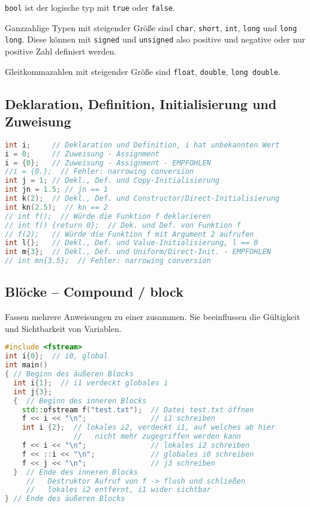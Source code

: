 \lstinline|bool| ist der logische typ mit \lstinline|true| oder
\lstinline|false|.

Ganzzahlige Typen mit steigender Größe sind \lstinline|char|, \lstinline|short|,
\lstinline|int|, \lstinline|long| und \lstinline|long long|. Diese können mit
\lstinline|signed| und \lstinline|unsigned| also positive und negative oder nur
positive Zahl definiert werden.

Gleitkommazahlen mit steigender Größe sind \lstinline|float|,
\lstinline|double|, \lstinline|long double|.

\subsection{Deklaration, Definition, Initialisierung und Zuweisung}

\begin{lstlisting}[language=C++]
int i;     // Deklaration und Definition, i hat unbekannten Wert
i = 0;     // Zuweisung - Assignment
i = {0};   // Zuweisung - Assignment - EMPFOHLEN
//i = {0.};  // Fehler: narrowing conversion
int j = 1; // Dekl., Def. und Copy-Initialisierung
int jn = 1.5; // jn == 1
int k(2);  // Dekl., Def. und Constructor/Direct-Initialisierung
int kn(2.5);  // kn == 2
// int f();  // Würde die Funktion f deklarieren
// int f() {return 0};  // Dek. und Def. von Funktion f
// f(2);   // Würde die Funktion f mit Argument 2 aufrufen
int l{};   // Dekl., Def. und Value-Initialisierung, l == 0
int m{3};  // Dekl., Def. und Uniform/Direct-Init. - EMPFOHLEN
// int mn{3.5};  // Fehler: narrowing conversion
\end{lstlisting}

\subsection{Blöcke -- Compound / block}

Fassen mehrere Anweisungen zu einer zusammen. Sie beeinflussen die Gültigkeit
und Sichtbarkeit von Variablen.

\begin{lstlisting}[language=C++]
#include <fstream>
int i{0};  // i0, global
int main()
{ // Beginn des äußeren Blocks
  int i{1};  // i1 verdeckt globales i
  int j{3};
  {  // Beginn des inneren Blocks
    std::ofstream f("test.txt");  // Datei test.txt öffnen
    f << i << "\n";               // i1 schreiben
    int i {2};  // lokales i2, verdeckt i1, auf welches ab hier
                //   nicht mehr zugegriffen werden kann
    f << i << "\n";               // lokales i2 schreiben
    f << ::i << "\n";             // globales i0 schreiben
    f << j << "\n";               // j3 schreiben
  }  // Ende des inneren Blocks
     //   Destruktor Aufruf von f -> flush und schließen
     //   lokales i2 entfernt, i1 wider sichtbar
} // Ende des äußeren Blocks
\end{lstlisting}
